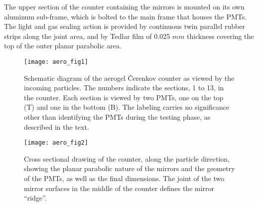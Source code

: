 The upper section of the counter containing the mirrors is mounted on its
own aluminum sub-frame, which is bolted to the main frame that houses the PMTs. 
The light and gas sealing action is provided by continuous twin parallel rubber
strips along the joint area, and by Tedlar film of 0.025 $mm$ thickness
covering the top of the outer planar parabolic area. 
%
\begin{figure}[p]
\texttt{[image: aero\_fig1]}
\caption[Aerogel:layout]{
 Schematic diagram of the aerogel \v{C}erenkov counter as viewed by the
 incoming particles.  The numbers indicate the sections, 1 to 13, in the
 counter. Each section is viewed by two PMTs, one on the top (T) and one in the
 bottom (B). The labeling carries no significance other than identifying the
 PMTs during the testing phase, as described in the text.
 }
\label{fig:aero_fig1}
\end{figure}

\begin{figure}[tbh]
\texttt{[image: aero\_fig2]}
\caption[Aerogel:mirrors]{
 Cross sectional drawing of the counter, along the particle direction, 
 showing the planar parabolic nature of the mirrors and the geometry of the 
 PMTs, as well as the final dimensions.  The joint of the two mirror surfaces in
 the middle of the counter defines the mirror ``ridge''.
 }
\label{fig:aero_fig2}
\end{figure}

